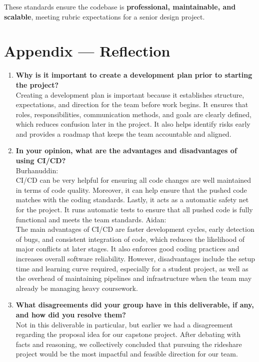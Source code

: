 \documentclass{article}
\begin{document}
These standards ensure the codebase is \textbf{professional, maintainable, and scalable}, meeting rubric expectations for a senior design project.

\newpage{}

\section*{Appendix --- Reflection}



\begin{enumerate}
  \item \textbf{Why is it important to create a development plan prior to starting the project?} \\ 
  Creating a development plan is important because it establishes structure, expectations, and direction for the team before work begins. It ensures that roles, responsibilities, communication methods, and goals are clearly defined, which reduces confusion later in the project. It also helps identify risks early and provides a roadmap that keeps the team accountable and aligned.
  \item \textbf{In your opinion, what are the advantages and disadvantages of using CI/CD?} \\ 
  Burhanuddin:\\
  CI/CD can be very helpful for ensuring all code changes are well maintained in terms of code quality. Moreover, it can help ensure that the pushed code matches with the coding standards. Lastly, it acts as a automatic safety net for the project. It runs automatic tests to ensure that all pushed code is fully functional and meets the team standards. 
  Aidan:\\
  The main advantages of CI/CD are faster development cycles, early detection of bugs, and consistent integration of code, which reduces the likelihood of major conflicts at later stages. It also enforces good coding practices and increases overall software reliability. However, disadvantages include the setup time and learning curve required, especially for a student project, as well as the overhead of maintaining pipelines and infrastructure when the team may already be managing heavy coursework.
  \item \textbf{What disagreements did your group have in this deliverable, if any, and how did you resolve them?} \\ 
  Not in this deliverable in particular, but earlier we had a disagreement regarding the proposal idea for our capstone project. After debating with facts and reasoning, we collectively concluded that pursuing the rideshare project would be the most impactful and feasible direction for our team.
\end{enumerate}
\end{document}
